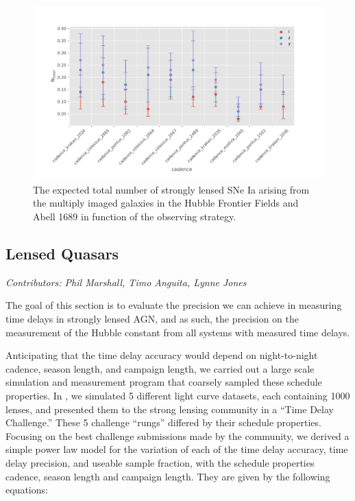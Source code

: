 \begin{figure}
\centering
\includegraphics[scale=0.65]{figures/sl_galaxy_lensing.pdf}\caption{The expected total number of strongly lensed SNe Ia arising from the multiply imaged galaxies in the Hubble Frontier Fields and Abell 1689 in function of the observing strategy. }
\end{figure}


\subsection{Lensed Quasars}
\textit{Contributors: Phil Marshall, Timo Anguita, Lynne Jones}


The goal of this section is to evaluate the precision we can achieve in measuring time delays in strongly lensed AGN, and as such, the precision on the measurement of the Hubble constant from all systems with measured time delays.

Anticipating that the time delay accuracy would depend on night-to-night
cadence, season length, and campaign length, we carried out a large
scale simulation and measurement program that coarsely sampled these
schedule properties. In \cite{Liao2015}, we simulated 5 different
light curve datasets, each containing 1000 lenses, and presented them to
the strong lensing community in a ``Time Delay Challenge.'' These 5
challenge ``rungs'' differed by their schedule properties. Focusing on the best challenge
submissions made by the community, we derived a simple power law model
for the variation of each of the time delay accuracy, time delay
precision, and useable sample fraction, with the schedule properties
cadence, season length and campaign length. They are
given by the following equations:

